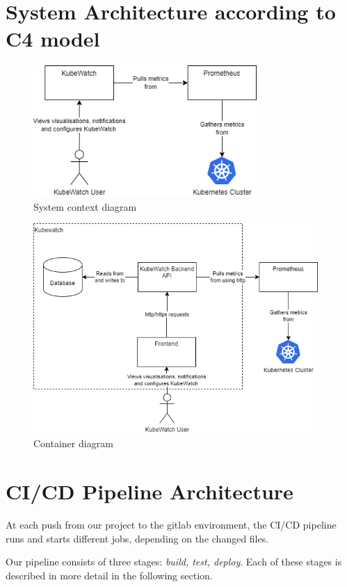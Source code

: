 \section{System Architecture according to C4 model}
\begin{figure}[H]
  \centering
  \includegraphics[height=5cm]{resources/System_context_diagram.png}
  \caption{System context diagram}
  \label{fig:system-context-diagram}
\end{figure}

\begin{figure}[H]
  \centering
  \includegraphics[height=8cm]{resources/Container_diagram.png}
  \caption{Container diagram}
  \label{fig:container-diagram}
\end{figure}

\pagebreak
\section{CI/CD Pipeline Architecture}
At each push from our project to the gitlab environment, the CI/CD pipeline runs and starts different jobs, depending on the changed files.

Our pipeline consists of three stages: \textit{build, test, deploy}. Each of these stages is described in more detail in the following section.

